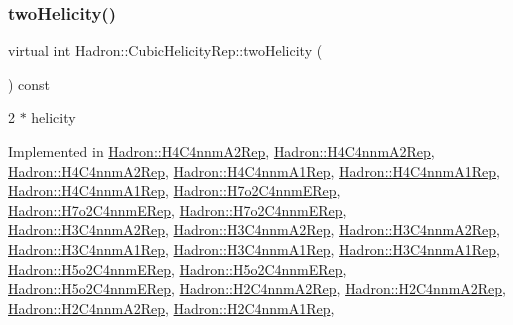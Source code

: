 \subsubsection{\texorpdfstring{twoHelicity()}{twoHelicity()}\hspace{0.1cm}{\footnotesize\ttfamily [1/3]}}
{\footnotesize\ttfamily virtual int Hadron\+::\+Cubic\+Helicity\+Rep\+::two\+Helicity (\begin{DoxyParamCaption}{ }\end{DoxyParamCaption}) const\hspace{0.3cm}{\ttfamily [pure virtual]}}

2 $\ast$ helicity 

Implemented in \mbox{\hyperlink{structHadron_1_1H4C4nnmA2Rep_ab2b49f0e189eae4dc52cb9ab1d7f9b11}{Hadron\+::\+H4\+C4nnm\+A2\+Rep}}, \mbox{\hyperlink{structHadron_1_1H4C4nnmA2Rep_ab2b49f0e189eae4dc52cb9ab1d7f9b11}{Hadron\+::\+H4\+C4nnm\+A2\+Rep}}, \mbox{\hyperlink{structHadron_1_1H4C4nnmA2Rep_ab2b49f0e189eae4dc52cb9ab1d7f9b11}{Hadron\+::\+H4\+C4nnm\+A2\+Rep}}, \mbox{\hyperlink{structHadron_1_1H4C4nnmA1Rep_a8f570a8c9ad6fc04e9458e44562b8b21}{Hadron\+::\+H4\+C4nnm\+A1\+Rep}}, \mbox{\hyperlink{structHadron_1_1H4C4nnmA1Rep_a8f570a8c9ad6fc04e9458e44562b8b21}{Hadron\+::\+H4\+C4nnm\+A1\+Rep}}, \mbox{\hyperlink{structHadron_1_1H4C4nnmA1Rep_a8f570a8c9ad6fc04e9458e44562b8b21}{Hadron\+::\+H4\+C4nnm\+A1\+Rep}}, \mbox{\hyperlink{structHadron_1_1H7o2C4nnmERep_a31bbba3df84a0943bb90635b1c99e5f0}{Hadron\+::\+H7o2\+C4nnm\+E\+Rep}}, \mbox{\hyperlink{structHadron_1_1H7o2C4nnmERep_a31bbba3df84a0943bb90635b1c99e5f0}{Hadron\+::\+H7o2\+C4nnm\+E\+Rep}}, \mbox{\hyperlink{structHadron_1_1H7o2C4nnmERep_a31bbba3df84a0943bb90635b1c99e5f0}{Hadron\+::\+H7o2\+C4nnm\+E\+Rep}}, \mbox{\hyperlink{structHadron_1_1H3C4nnmA2Rep_aeeec45fb753cc4ac9b6de1d24a868ab9}{Hadron\+::\+H3\+C4nnm\+A2\+Rep}}, \mbox{\hyperlink{structHadron_1_1H3C4nnmA2Rep_aeeec45fb753cc4ac9b6de1d24a868ab9}{Hadron\+::\+H3\+C4nnm\+A2\+Rep}}, \mbox{\hyperlink{structHadron_1_1H3C4nnmA2Rep_aeeec45fb753cc4ac9b6de1d24a868ab9}{Hadron\+::\+H3\+C4nnm\+A2\+Rep}}, \mbox{\hyperlink{structHadron_1_1H3C4nnmA1Rep_af309cb443b7986be792a59cbf09758c3}{Hadron\+::\+H3\+C4nnm\+A1\+Rep}}, \mbox{\hyperlink{structHadron_1_1H3C4nnmA1Rep_af309cb443b7986be792a59cbf09758c3}{Hadron\+::\+H3\+C4nnm\+A1\+Rep}}, \mbox{\hyperlink{structHadron_1_1H3C4nnmA1Rep_af309cb443b7986be792a59cbf09758c3}{Hadron\+::\+H3\+C4nnm\+A1\+Rep}}, \mbox{\hyperlink{structHadron_1_1H5o2C4nnmERep_a5b15b3ef270c38266d305dfec412684d}{Hadron\+::\+H5o2\+C4nnm\+E\+Rep}}, \mbox{\hyperlink{structHadron_1_1H5o2C4nnmERep_a5b15b3ef270c38266d305dfec412684d}{Hadron\+::\+H5o2\+C4nnm\+E\+Rep}}, \mbox{\hyperlink{structHadron_1_1H5o2C4nnmERep_a5b15b3ef270c38266d305dfec412684d}{Hadron\+::\+H5o2\+C4nnm\+E\+Rep}}, \mbox{\hyperlink{structHadron_1_1H2C4nnmA2Rep_ad9e40b53e19e1adae3441a6a6320d3b1}{Hadron\+::\+H2\+C4nnm\+A2\+Rep}}, \mbox{\hyperlink{structHadron_1_1H2C4nnmA2Rep_ad9e40b53e19e1adae3441a6a6320d3b1}{Hadron\+::\+H2\+C4nnm\+A2\+Rep}}, \mbox{\hyperlink{structHadron_1_1H2C4nnmA2Rep_ad9e40b53e19e1adae3441a6a6320d3b1}{Hadron\+::\+H2\+C4nnm\+A2\+Rep}}, \mbox{\hyperlink{structHadron_1_1H2C4nnmA1Rep_ae55afbd5a5aede69fcb5415b54b00b07}{Hadron\+::\+H2\+C4nnm\+A1\+Rep}}, 